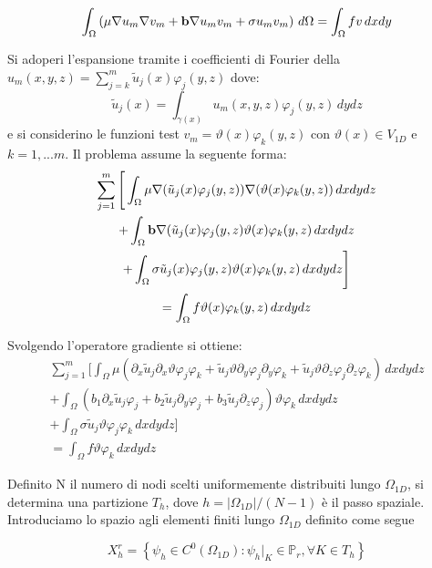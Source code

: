 \begin{multline}
\int_\Omega\left(\mu\nabla u_m\nabla v_m + \mathbf{b}\nabla u_mv_m+\sigma u_mv_m\right)\,d\Omega
=\int_\Omega fv \,dxdy
\end{multline}

Si adoperi l'espansione tramite i coefficienti di Fourier della $u_m(x,y,z)=\sum_{j=k}^m\tilde{u}_j(x)\varphi _j(y,z)$ dove:
\begin{displaymath}
\tilde{u}_j(x)=\int_{\gamma(x)}u_m(x,y,z) \varphi_j(y,z)\,dydz
\end{displaymath}
e si considerino le funzioni test $v_m=\vartheta(x)\varphi _k(y,z)$ con $\vartheta(x)\in V_{1D}$ e $k=1,...m$. Il problema assume la seguente forma:
\begin{multline}
\sum_{j=1}^m \Bigg[
\int_\Omega\mu\nabla (\tilde{u}_j(x)\varphi _j(y,z))\nabla (\vartheta(x)\varphi _k(y,z))\,dxdydz\\
+\int_\Omega\mathbf{b}\nabla (\tilde{u}_j(x)\varphi _j(y,z)\vartheta(x)\varphi _k(y,z)\,dxdydz\\
+\int_\Omega\sigma\tilde{u}_j(x)\varphi _j(y,z)\vartheta(x)\varphi _k(y,z)\,dxdydz \Bigg] \\
=\int_\Omega f\vartheta(x)\varphi _k(y,z)\,dxdydz\\
\end{multline}

Svolgendo l'operatore gradiente si ottiene:
\begin{multline}
\sum_{j=1}^m \Bigg[
\int_\Omega\mu( \partial_x\tilde{u}_j \partial_x\vartheta\varphi _j\varphi _k + \tilde{u}_j \vartheta \partial_y\varphi _j\partial_y\varphi _k + \tilde{u}_j \vartheta \partial_z\varphi _j\partial_z\varphi _k)\,dxdydz \\
+ \int_\Omega (b_1\partial_x\tilde{u}_j\varphi _j+b_2\tilde{u}_j\partial_y\varphi _j + b_3\tilde{u}_j\partial_z\varphi_j)\vartheta\varphi _k\,dxdydz\\ 
+ \int_\Omega \sigma\tilde{u}_j\vartheta\varphi _j\varphi _k\,dxdydz \Bigg]\\
=\int_\Omega f\vartheta\varphi _k\,dxdydz
\end{multline}


Definito N il numero di nodi scelti uniformemente distribuiti lungo $\Omega_{1D}$, si determina una partizione $T_h$, dove $h=\vert \Omega_{1D}\vert / (N-1)$ \`e il passo spaziale. Introduciamo lo spazio agli elementi finiti lungo $\Omega_{1D}$ definito come segue

\begin{displaymath}
X_h^r= \left\{\psi_h \in C^0(\Omega_{1D}): \psi_h \vert_K  \in \mathbb{P}_r,\forall K\in T_h \right\}
\end{displaymath}

